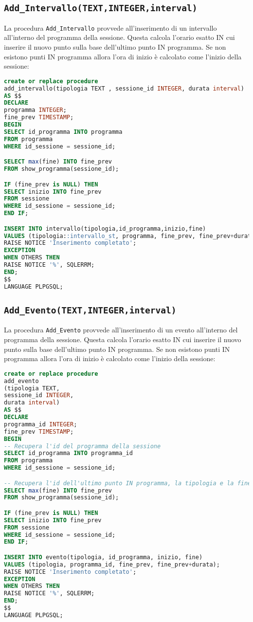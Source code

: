 \subsection{\texttt{Add\_Intervallo(TEXT,INTEGER,interval)}}
La procedura \texttt{Add\_Intervallo} provvede all'inserimento di un intervallo all'interno del programma della sessione. Questa calcola l'orario esatto IN cui inserire il nuovo punto sulla base dell'ultimo punto IN programma. Se non esistono punti IN programma allora l'ora di inizio è calcolato come l'inizio della sessione:
\begin{lstlisting}[language=SQL,style=mystyle]
create or replace procedure 
add_intervallo(tipologia TEXT , sessione_id INTEGER, durata interval)
AS $$
DECLARE
programma INTEGER;
fine_prev TIMESTAMP;
BEGIN
SELECT id_programma INTO programma
FROM programma
WHERE id_sessione = sessione_id;

SELECT max(fine) INTO fine_prev
FROM show_programma(sessione_id);

IF (fine_prev is NULL) THEN
SELECT inizio INTO fine_prev
FROM sessione
WHERE id_sessione = sessione_id;
END IF;

INSERT INTO intervallo(tipologia,id_programma,inizio,fine)
VALUES (tipologia::intervallo_st, programma, fine_prev, fine_prev+durata);
RAISE NOTICE 'Inserimento completato';
EXCEPTION
WHEN OTHERS THEN
RAISE NOTICE '%', SQLERRM;
END;
$$ 
LANGUAGE PLPGSQL;
\end{lstlisting}
\subsection{\texttt{Add\_Evento(TEXT,INTEGER,interval)}}
La procedura \texttt{Add\_Evento} provvede all'inserimento di un evento all'interno del programma della sessione. Questa calcola l'orario esatto IN cui inserire il nuovo punto sulla base dell'ultimo punto IN programma. Se non esistono punti IN programma allora l'ora di inizio è calcolato come l'inizio della sessione:
\begin{lstlisting}[language=SQL,style=mystyle]
create or replace procedure 
add_evento
(tipologia TEXT, 
sessione_id INTEGER, 
durata interval)
AS $$
DECLARE
programma_id INTEGER;
fine_prev TIMESTAMP;
BEGIN
-- Recupera l'id del programma della sessione
SELECT id_programma INTO programma_id
FROM programma
WHERE id_sessione = sessione_id;

-- Recupera l'id dell'ultimo punto IN programma, la tipologia e la fine
SELECT max(fine) INTO fine_prev
FROM show_programma(sessione_id);

IF (fine_prev is NULL) THEN
SELECT inizio INTO fine_prev
FROM sessione
WHERE id_sessione = sessione_id;
END IF;

INSERT INTO evento(tipologia, id_programma, inizio, fine)
VALUES (tipologia, programma_id, fine_prev, fine_prev+durata);
RAISE NOTICE 'Inserimento completato';
EXCEPTION
WHEN OTHERS THEN
RAISE NOTICE '%', SQLERRM;
END;
$$
LANGUAGE PLPGSQL;
\end{lstlisting}
